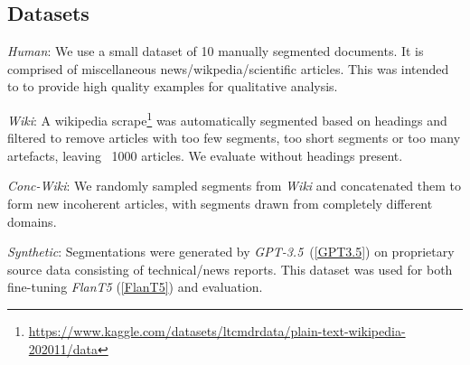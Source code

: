 \subsection{Datasets}


\emph{Human}: We use a small dataset of 10 manually segmented documents. It is comprised of miscellaneous news/wikpedia/scientific articles. This was intended to to provide high quality examples for qualitative analysis.

\emph{Wiki}: A wikipedia scrape\footnote{\url{https://www.kaggle.com/datasets/ltcmdrdata/plain-text-wikipedia-202011/data}} was automatically segmented based on headings and filtered to remove articles with too few segments, too short segments or too many artefacts, leaving ~1000 articles. We evaluate without headings present.

\emph{Conc-Wiki}: We randomly sampled segments from \emph{Wiki} and concatenated them to form new incoherent articles, with segments drawn from completely different domains.

\emph{Synthetic}: Segmentations were generated by \emph{GPT-3.5}~(\ref{GPT3.5}) on proprietary source data consisting of technical/news reports. This dataset was used for both fine-tuning \emph{FlanT5} (\ref{FlanT5}) and evaluation.
